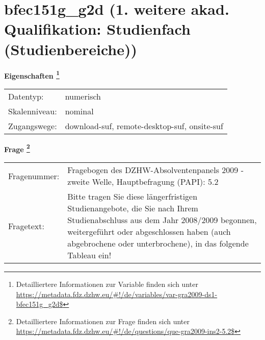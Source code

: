 
    \setcounter{footnote}{0}

    \vspace*{-1.8cm}
	\section{bfec151g\_g2d (1. weitere akad. Qualifikation: Studienfach (Studienbereiche))}
	\label{section:bfec151g_g2d}



    \vspace*{0.5cm}
    \noindent\textbf{Eigenschaften
	\footnote{Detailliertere Informationen zur Variable finden sich unter
		\url{https://metadata.fdz.dzhw.eu/\#!/de/variables/var-gra2009-ds1-bfec151g_g2d$}}}\\
	\begin{tabularx}{\hsize}{@{}lX}
	Datentyp: & numerisch \\
	Skalenniveau: & nominal \\
	Zugangswege: &
	  download-suf, 
	  remote-desktop-suf, 
	  onsite-suf
 \\
    \end{tabularx}



				\vspace*{0.5cm}
                \noindent\textbf{Frage
	                \footnote{Detailliertere Informationen zur Frage finden sich unter
		              \url{https://metadata.fdz.dzhw.eu/\#!/de/questions/que-gra2009-ins2-5.2$}}}\\
				\begin{tabularx}{\hsize}{@{}lX}
					Fragenummer: &
					  Fragebogen des DZHW-Absolventenpanels 2009 - zweite Welle, Hauptbefragung (PAPI):
					  5.2
 \\
					Fragetext: & Bitte tragen Sie diese längerfristigen Studienangebote, die Sie nach Ihrem Studienabschluss aus dem Jahr 2008/2009 begonnen, weitergeführt oder abgeschlossen haben (auch abgebrochene oder unterbrochene), in das folgende Tableau ein! \\
				\end{tabularx}





